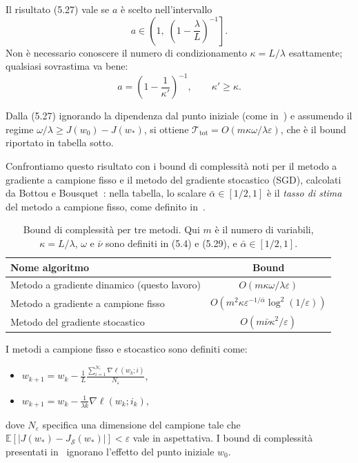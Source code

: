 \documentclass[a4paper,12pt]{article}
\numberwithin{equation}{section}
\numberwithin{figure}{section}
\numberwithin{table}{section}
\begin{document}
Il risultato (5.27) vale se \(a\) è scelto nell'intervallo
\[
a \in \left(1,\; \left(1 - \frac{\lambda}{L}\right)^{-1}\right].
\]
Non è necessario conoscere il numero di condizionamento \(\kappa = L/\lambda\) esattamente; qualsiasi sovrastima va bene:
\[
a = \left(1 - \frac{1}{\kappa'}\right)^{-1}, \qquad \kappa' \ge \kappa. \tag{5.28}
\]

Dalla (5.27) ignorando la dipendenza dal punto iniziale (come in~\cite{bottou2008}) e assumendo il regime $\omega/\lambda \geq J(w_0)-J(w_*)$, si ottiene $\mathcal{T}_{\mathrm{tot}} = O(m\kappa\omega/\lambda\varepsilon)$, che è il bound riportato in tabella sotto.

Confrontiamo questo risultato con i bound di complessità noti per il metodo a gradiente a campione fisso e il metodo del gradiente stocastico (SGD), calcolati da Bottou e Bousquet~\cite{bottou2008}: nella tabella, lo scalare $\bar{\alpha} \in [1/2, 1]$ è il \textit{tasso di stima} del metodo a campione fisso, come definito in~\cite{bottou2008}.
\begin{table}[h]
\centering
\begin{tabular}{|l|c|}
\hline
\textbf{Nome algoritmo} & \textbf{Bound} \\
\hline
Metodo a gradiente dinamico (questo lavoro) & \(O(m\kappa \omega / \lambda \varepsilon)\) \\
Metodo a gradiente a campione fisso & \(O(m^2 \kappa\varepsilon^{-1/\bar{\alpha}} \log^2(1/\varepsilon))\) \\
Metodo del gradiente stocastico & \(O(m\bar{\nu}\kappa^2 / \varepsilon)\) \\
\hline
\end{tabular}
\caption{Bound di complessità per tre metodi. Qui \(m\) è il numero di variabili, \(\kappa = L/\lambda\), \(\omega\) e \(\bar{\nu}\) sono definiti in (5.4) e (5.29), e \(\bar{\alpha} \in [1/2, 1]\).}
\end{table}

I metodi a campione fisso e stocastico sono definiti come:
\begin{itemize}
  \item {} \(w_{k+1} = w_k - \frac{1}{L} \frac{\sum_{i=1}^{N_\varepsilon} \nabla \ell(w_k;i)}{N_\varepsilon}\),
  \item {} \(w_{k+1} = w_k - \frac{1}{\lambda k} \nabla \ell(w_k; i_k)\),
\end{itemize}
dove \(N_\varepsilon\) specifica una dimensione del campione tale che \(\mathbb{E}[|J(w_*) - J_{\mathcal{S}}(w_*)|] < \varepsilon\) vale in aspettativa. I bound di complessità presentati in~\cite{bottou2008} ignorano l'effetto del punto iniziale \(w_0\).
\end{document}
